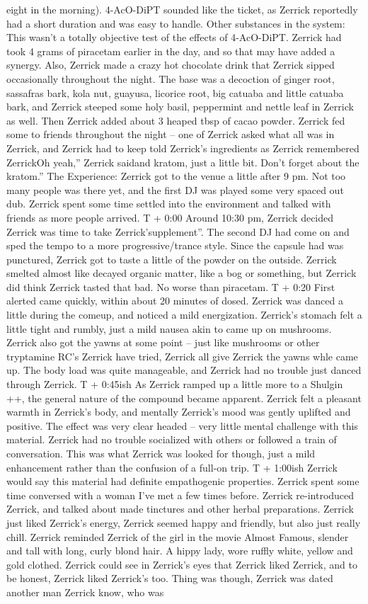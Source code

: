 \documentclass[12pt]{book}
\begin{document}
eight in the morning). 4-AcO-DiPT sounded like the ticket, as Zerrick reportedly had a short duration and was easy to handle. Other substances in the system: This wasn't a totally objective test of the effects of 4-AcO-DiPT. Zerrick had took 4 grams of piracetam earlier in the day, and so that may have added a synergy. Also, Zerrick made a crazy hot chocolate drink that Zerrick sipped occasionally throughout the night. The base was a decoction of ginger root, sassafras bark, kola nut, guayusa, licorice root, big catuaba and little catuaba bark, and Zerrick steeped some holy basil, peppermint and nettle leaf in Zerrick as well. Then Zerrick added about 3 heaped tbsp of cacao powder. Zerrick fed some to friends throughout the night -- one of Zerrick asked what all was in Zerrick, and Zerrick had to keep told Zerrick's ingredients as Zerrick remembered ZerrickOh yeah,'' Zerrick saidand kratom, just a little bit. Don't forget about the kratom.'' The Experience: Zerrick got to the venue a little after 9 pm. Not too many people was there yet, and the first DJ was played some very spaced out dub. Zerrick spent some time settled into the environment and talked with friends as more people arrived. T + 0:00 Around 10:30 pm, Zerrick decided Zerrick was time to take Zerrick'supplement''. The second DJ had come on and sped the tempo to a more progressive/trance style. Since the capsule had was punctured, Zerrick got to taste a little of the powder on the outside. Zerrick smelted almost like decayed organic matter, like a bog or something, but Zerrick did think Zerrick tasted that bad. No worse than piracetam. T + 0:20 First alerted came quickly, within about 20 minutes of dosed. Zerrick was danced a little during the comeup, and noticed a mild energization. Zerrick's stomach felt a little tight and rumbly, just a mild nausea akin to came up on mushrooms. Zerrick also got the yawns at some point -- just like mushrooms or other tryptamine RC's Zerrick have tried, Zerrick all give Zerrick the yawns whle came up. The body load was quite manageable, and Zerrick had no trouble just danced through Zerrick. T + 0:45ish As Zerrick ramped up a little more to a Shulgin ++, the general nature of the compound became apparent. Zerrick felt a pleasant warmth in Zerrick's body, and mentally Zerrick's mood was gently uplifted and positive. The effect was very clear headed -- very little mental challenge with this material. Zerrick had no trouble socialized with others or followed a train of conversation. This was what Zerrick was looked for though, just a mild enhancement rather than the confusion of a full-on trip. T + 1:00ish Zerrick would say this material had definite empathogenic properties. Zerrick spent some time conversed with a woman I've met a few times before. Zerrick re-introduced Zerrick, and talked about made tinctures and other herbal preparations. Zerrick just liked Zerrick's energy, Zerrick seemed happy and friendly, but also just really chill. Zerrick reminded Zerrick of the girl in the movie Almost Famous, slender and tall with long, curly blond hair. A hippy lady, wore ruffly white, yellow and gold clothed. Zerrick could see in Zerrick's eyes that Zerrick liked Zerrick, and to be honest, Zerrick liked Zerrick's too. Thing was though, Zerrick was dated another man Zerrick know, who was 
\end{document}
